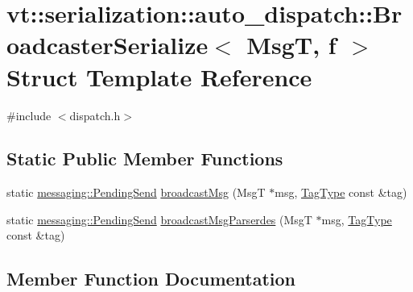 \hypertarget{structvt_1_1serialization_1_1auto__dispatch_1_1_broadcaster_serialize}{}\section{vt\+:\+:serialization\+:\+:auto\+\_\+dispatch\+:\+:Broadcaster\+Serialize$<$ MsgT, f $>$ Struct Template Reference}
\label{structvt_1_1serialization_1_1auto__dispatch_1_1_broadcaster_serialize}


{\ttfamily \#include $<$dispatch.\+h$>$}

\subsection*{Static Public Member Functions}
\begin{DoxyCompactItemize}
\item 
static \hyperlink{structvt_1_1messaging_1_1_pending_send}{messaging\+::\+Pending\+Send} \hyperlink{structvt_1_1serialization_1_1auto__dispatch_1_1_broadcaster_serialize_a7ef23f4645498ccec483ccff4502c9bc}{broadcast\+Msg} (MsgT $\ast$msg, \hyperlink{namespacevt_a84ab281dae04a52a4b243d6bf62d0e52}{Tag\+Type} const \&tag)
\item 
static \hyperlink{structvt_1_1messaging_1_1_pending_send}{messaging\+::\+Pending\+Send} \hyperlink{structvt_1_1serialization_1_1auto__dispatch_1_1_broadcaster_serialize_af56cd581c257a02f6344de28bc5aa893}{broadcast\+Msg\+Parserdes} (MsgT $\ast$msg, \hyperlink{namespacevt_a84ab281dae04a52a4b243d6bf62d0e52}{Tag\+Type} const \&tag)
\end{DoxyCompactItemize}


\subsection{Member Function Documentation}
\mbox{\label{structvt_1_1serialization_1_1auto__dispatch_1_1_broadcaster_serialize_a7ef23f4645498ccec483ccff4502c9bc}} 
